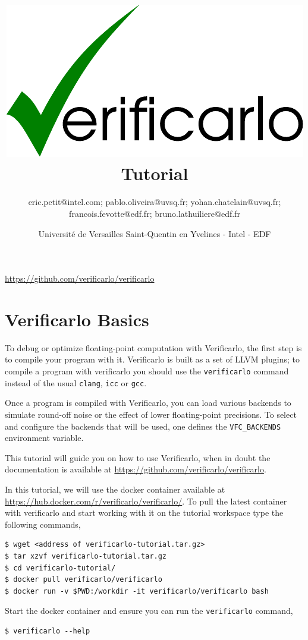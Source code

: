 \documentclass{TP}
\title{\includegraphics[keepaspectratio, scale=0.4]{verificarlo-logo.pdf}\\[4mm]
  Tutorial}
\author{eric.petit@intel.com; pablo.oliveira@uvsq.fr; yohan.chatelain@uvsq.fr;
  francois.fevotte@edf.fr; bruno.lathuiliere@edf.fr}
\date{Université de Versailles Saint-Quentin en Yvelines - Intel - EDF}
\begin{document}
\maketitle

\centerline{\url{https://github.com/verificarlo/verificarlo}}
\tableofcontents


\section{Verificarlo Basics}

To debug or optimize floating-point computation with Verificarlo, the first
step is to compile your program with it. Verificarlo is built as a set of LLVM
plugins; to compile a program with verificarlo you should use the \texttt{verificarlo}
command instead of the usual \texttt{clang}, \texttt{icc} or \texttt{gcc}.

Once a program is compiled with Verificarlo, you can load various backends to
simulate round-off noise or the effect of lower floating-point precisions.  To
select and configure the backends that will be used, one defines the
\texttt{VFC\_BACKENDS} environment variable.

This tutorial will guide you on how to use Verificarlo, when in doubt the
documentation is available at \url{https://github.com/verificarlo/verificarlo}.

In this tutorial, we will use the docker container available at
\url{https://hub.docker.com/r/verificarlo/verificarlo/}.
To pull the latest container with verificarlo and start working with it on
the tutorial workspace type the following commands,
\begin{verbatim}
$ wget <address of verificarlo-tutorial.tar.gz>
$ tar xzvf verificarlo-tutorial.tar.gz
$ cd verificarlo-tutorial/
$ docker pull verificarlo/verificarlo
$ docker run -v $PWD:/workdir -it verificarlo/verificarlo bash
\end{verbatim}

\begin{question}
  Start the docker container and ensure you can run the \texttt{verificarlo} command,
\begin{verbatim}
$ verificarlo --help
\end{verbatim}
\end{question}




\FloatBarrier


\FloatBarrier



\FloatBarrier
\newpage


\end{document}
